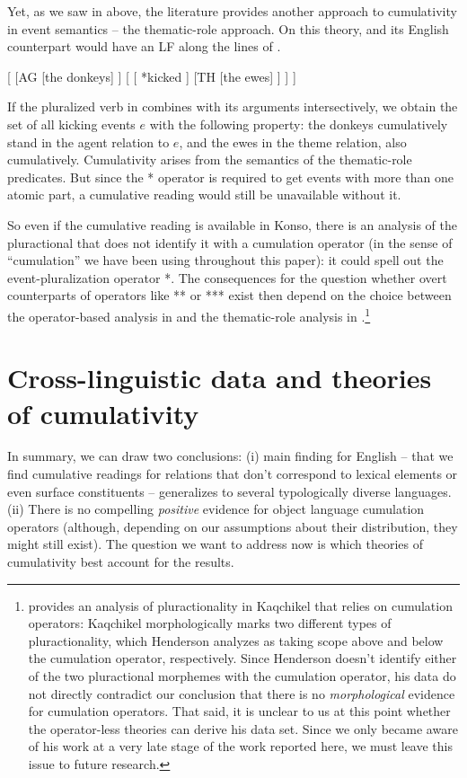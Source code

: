 \documentclass[output=paper]{langscibook}
\begin{document}
\noindent Yet, as we saw in  above, the literature provides another approach to cumulativity in event semantics -- the thematic-role approach. On this theory,  and its English counterpart would have an LF along the lines of .

\ea \label{has-sch:18c} [ [AG [the donkeys] ] [ [ *kicked ] [TH [the ewes] ] ] ]
\z

\noindent If the pluralized verb in  combines with its arguments intersectively, we obtain the set of all kicking events $e$ with the following property: the donkeys cumulatively stand in the agent relation to $e$, and the ewes in the theme relation, also cumulatively. Cumulativity arises from the semantics of the thematic-role predicates. But since the * operator is required to get events with more than one atomic part, a cumulative reading would still be unavailable without it.

So even if the cumulative reading is available in Konso, there is an analysis of the pluractional that does not identify it with a cumulation operator (in the sense of ``cumulation'' we have been using throughout this paper): it could spell out the event-pluralization operator *. The consequences for the question whether overt counterparts of operators like ** or *** exist then depend on the choice between the operator-based analysis in  and the thematic-role analysis in .\footnote{\citet{Henderson:2012} provides an analysis of pluractionality in Kaqchikel that relies on cumulation operators: Kaqchikel morphologically marks two different types of pluractionality, which Henderson analyzes as taking scope above and below the cumulation operator, respectively. Since Henderson doesn't identify either of the two pluractional morphemes with the cumulation operator, his data do not directly contradict our conclusion that there is no \textit{morphological} evidence for cumulation operators. That said, it is unclear to us at this point whether the operator-less theories can derive his data set. Since we only became aware of his work at a very late stage of the work reported here, we must leave this issue to future research.}


\section{Cross-linguistic data and theories of cumulativity}\label{has-sch:sec:4}

In summary, we can draw two conclusions: (i)  main finding for English -- that we find cumulative readings for relations that don't correspond to lexical elements or even surface constituents -- generalizes to several typologically diverse languages. (ii) There is no compelling \textit{positive} evidence for object language cumulation operators (although, depending on our assumptions about their distribution, they might still exist). The question we want to address now is which theories of cumulativity best account for the results.
\end{document}
